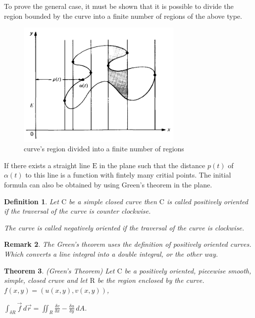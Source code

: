 \documentclass[a4paper]{book}
\newtheorem{theorem}{Theorem}%
\newtheorem{remark}[theorem]{Remark}%
\newtheorem{definition}[theorem]{Definition}%
\numberwithin{theorem}{section}%
\begin{document}
To prove the general case, it must be shown that it is possible to divide the region bounded by the curve into a finite number of regions of the above type.
\begin{figure}[hbt!]
    \begin{center}   
        \includegraphics[width=80mm]{Schmidt2}
        \caption{curve's region divided into a finite number of regions}
    \end{center}
\end{figure}\leavevmode\newline\newline
If there exists a straight line $\mathrm{E}$ in the plane such that the distance $p(t)$ of $\alpha(t)$ to this line is a function with fintely many critial points. The initial formula can also be obtained by using Green's theorem in the plane.

\begin{definition}
    Let $\mathrm{C}$ be a simple closed curve then $\mathrm{C}$ is called positively oriented if the traversal of the curve is counter clockwise.

    The curve is called negatively oriented if the traversal of the curve is clockwise. 
\end{definition}

\begin{remark}
    The Green's theorem uses the definition of positively oriented curves. Which converts a line integral into a double integral, or the other way.
\end{remark}

\begin{theorem} (Green's Theorem)
    Let $\mathrm{C}$ be a positively oriented, piecewise smooth, simple, closed cruve and let $\mathrm{R}$ be the region enclosed by the curve. $f(x,y)=(u(x,y),v(x,y))$,

    \begin{center}
        $\displaystyle \int_{\delta R}\overrightarrow{f}\,d\overrightarrow{r}=\iint_{R}\frac{\delta v}{\delta x}-\frac{\delta u}{\delta y}\,dA$.
    \end{center}
\end{theorem}
\end{document}
